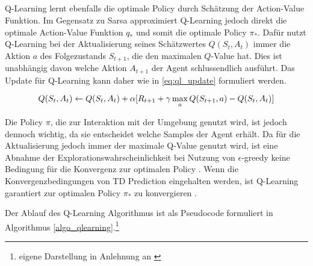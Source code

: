 \subsection{\qlearning}
Q-Learning lernt ebenfalls die optimale Policy durch Schätzung der Action-Value Funktion. 
Im Gegensatz zu Sarsa approximiert Q-Learning jedoch direkt die optimale Action-Value Funktion $q_*$ und somit die optimale Policy $\pi_*$.
Dafür nutzt Q-Learning bei der Aktualisierung seines Schätzwertes $Q(S_t,A_t)$ immer die Aktion $a$ des Folgezustands $S_{t+1}$, die den maximalen $Q$-Value hat.   
Dies ist  unabhängig davon welche Aktion $A_{t+1}$ der Agent schlussendlich ausführt.  \cite[S. 177]{watkinsLearningDelayedRewards1989} 
Das Update für Q-Learning kann daher wie in \cref{eq:ql_update} formuliert werden\cite[S. 131]{suttonReinforcementLearningIntroduction2018}.

\begin{equation}
    \label{eq:ql_update}
    \equationentry{TD Update Sarsa}
    Q(S_t,A_t)\leftarrow Q(S_t,A_t)+\alpha[R_{t+1}+\gamma\max_aQ(S_{t+1},a)-Q(S_t,A_t)]
\end{equation}

Die Policy $\pi$, die zur Interaktion mit der Umgebung genutzt wird, ist jedoch dennoch wichtig, da sie entscheidet welche Samples der Agent erhält. 
Da für die Aktualisierung jedoch immer der maximale Q-Value genutzt wird, ist eine Abnahme der Explorationswahrscheinlichkeit bei Nutzung von $\epsilon$-greedy keine Bedingung für die Konvergenz zur optimalen Policy \cite[S. 131f.]{suttonReinforcementLearningIntroduction2018}.
Wenn die Konvergenzbedingungen von \ac{TD} Prediction eingehalten werden, ist Q-Learning garantiert zur optimalen Policy $\pi_*$ zu konvergieren \cite[S. 286]{watkinsQlearning1992}.

Der Ablauf des Q-Learning Algorithmus ist als Pseudocode formuliert in Algorithmus \ref{algo_qlearning}.\footnote{eigene Darstellung in Anlehnung an \cite[S. 131]{suttonReinforcementLearningIntroduction2018}}




